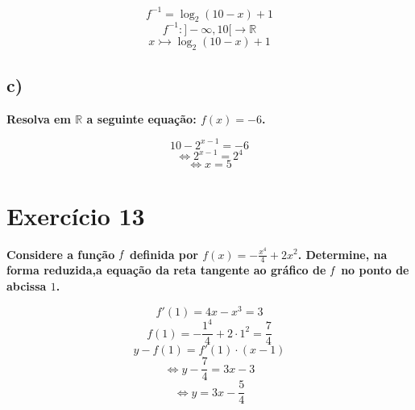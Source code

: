 \documentclass{article}
\begin{document}
\[f^{-1}=\log_{2}(10-x)+1\]
\[f^{-1}:]-\infty,10[\rightarrow \mathbb{R}\]
\[x\rightarrowtail \log_{2}(10-x)+1\]
\subsection*{c)} \textbf{Resolva em $\mathbb{R}$ a seguinte equação: $f(x) = -6$.}

\[10-2^{x-1}=-6\]
\[\Leftrightarrow 2^{x-1}=2^4\]
\[\Leftrightarrow x=5\]

\section*{Exercício 13}\textbf{Considere a função $\it{f}$ definida por $f(x) = -\frac{x^4}{4} + 2x^2$. Determine, na forma reduzida,a equação da reta tangente ao gráfico de $\it{f}$ no ponto de abcissa $1$.}

\[f'(1)=4x-x^3=3\]
\[f(1)=-\frac{1^4}{4}+2\cdot1^2=\frac{7}{4}\]
\[y-f(1)=f'(1)\cdot(x-1)\]
\[\Leftrightarrow y-\frac{7}{4}=3x-3\]
\[\Leftrightarrow y=3x-\frac{5}{4}\]
\end{document}
